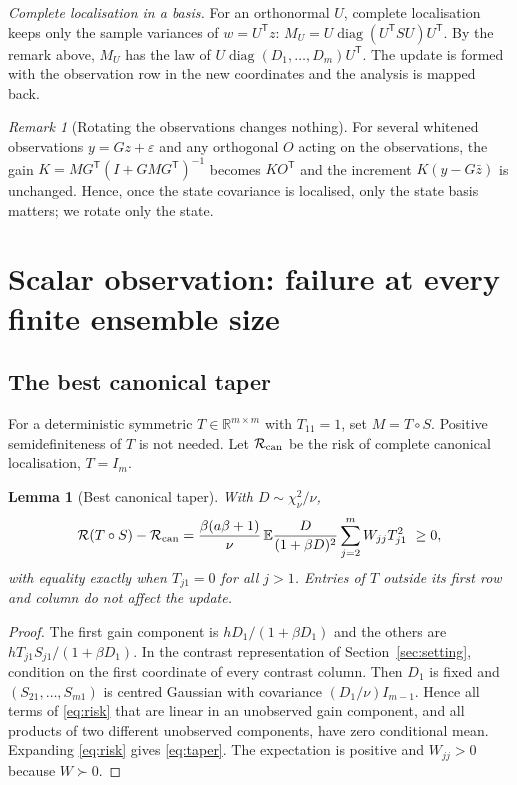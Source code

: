 \documentclass[11pt,a4paper]{article}
\numberwithin{equation}{section}
\newtheorem{lemma}[theorem]{Lemma}
\theoremstyle{remark}\newtheorem{remark}[theorem]{Remark}
\newcommand{\E}{\mathbb E}
\newcommand{\R}{\mathbb R}
\newcommand{\diag}{\operatorname{diag}}
\newcommand{\risk}{\mathcal R}
\newcommand{\T}{^{\mathsf T}}
\begin{document}
\emph{Complete localisation in a basis.} For an orthonormal \(U\), complete localisation keeps
only the sample variances of \(w=U\T z\): \(M_U=U\diag(U\T SU)U\T\). By the remark above,
\(M_U\) has the law of \(U\diag(D_1,\ldots,D_m)U\T\). The update is formed with the observation
row in the new coordinates and the analysis is mapped back.

\begin{remark}[Rotating the observations changes nothing]\label{rem:obsrot}
For several whitened observations \(y=Gz+\varepsilon\) and any orthogonal \(O\) acting on the
observations, the gain \(K=MG\T(I+GMG\T)^{-1}\) becomes \(KO\T\) and the increment
\(K(y-G\bar z)\) is unchanged. Hence, once the state covariance is localised, only the
state basis matters; we rotate only the state.
\end{remark}

\section{Scalar observation: failure at every finite ensemble size}\label{sec:scalar}

\subsection{The best canonical taper}

For a deterministic symmetric \(T\in\R^{m\times m}\) with \(T_{11}=1\), set \(M=T\circ S\).
Positive semidefiniteness of \(T\) is not needed. Let \(\risk_{\rm can}\) be the risk of complete
canonical localisation, \(T=I_m\).

\begin{lemma}[Best canonical taper]\label{lem:taper}
With \(D\sim\chi_\nu^2/\nu\),
\begin{equation}\label{eq:taper}
 \risk(T\circ S)-\risk_{\rm can}
 =\frac{\beta(a\beta+1)}{\nu}\,
   \E\frac{D}{(1+\beta D)^2}
   \sum_{j=2}^m W_{jj}T_{j1}^2\ \ge0,
\end{equation}
with equality exactly when \(T_{j1}=0\) for all \(j>1\). Entries of \(T\) outside its first row and
column do not affect the update.
\end{lemma}
\begin{proof}
The first gain component is \(hD_1/(1+\beta D_1)\) and the others are
\(hT_{j1}S_{j1}/(1+\beta D_1)\). In the contrast representation of Section~\ref{sec:setting},
condition on the first coordinate of every contrast column. Then \(D_1\) is fixed and
\((S_{21},\ldots,S_{m1})\) is centred Gaussian with covariance \((D_1/\nu)I_{m-1}\). Hence all
terms of \eqref{eq:risk} that are linear in an unobserved gain component, and all products of two
different unobserved components, have zero conditional mean. Expanding \eqref{eq:risk} gives
\eqref{eq:taper}. The expectation is positive and \(W_{jj}>0\) because \(W\succ0\).
\end{proof}
\end{document}

